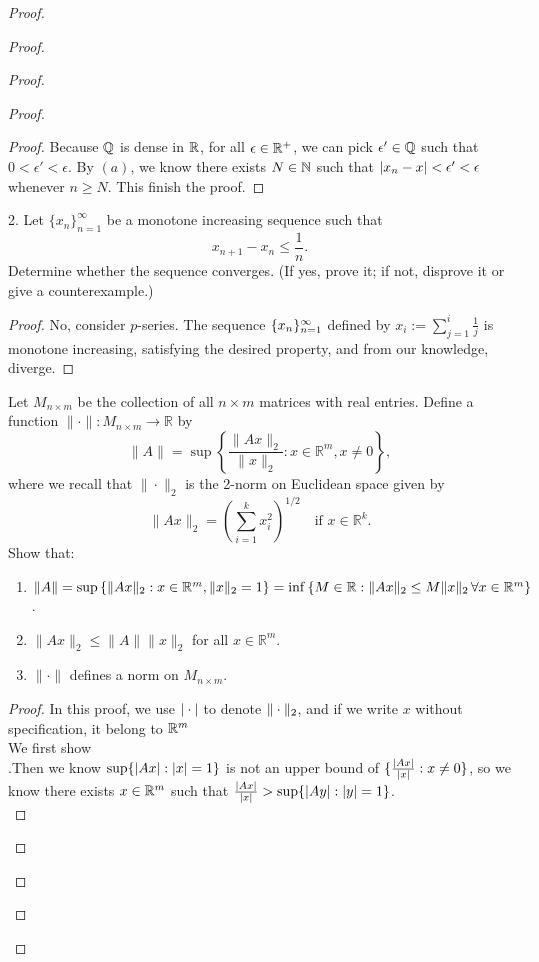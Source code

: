 \documentclass{report}
\begin{document}
\begin{proof}
\begin{proof}
\begin{proof}
\begin{proof}
\begin{proof}
Because $\mathbb{Q}$ is dense in  $\mathbb{R}$,  for all $\epsilon \in \mathbb{R}^+$, we can pick $\epsilon' \in \mathbb{Q}$ such that $0<\epsilon '< \epsilon $. By $(a)$,  we know there exists $N\in \mathbb{N}$ such that $|x_n-x|<\epsilon ' <\epsilon $ whenever $n\geq N$. This finish the proof.
\end{proof}
\begin{question}{}{}
2. Let $\{x_n\}_{n=1}^{\infty}$ be a monotone increasing sequence such that 
\[x_{n+1} - x_n \leq \frac{1}{n}.\]
Determine whether the sequence converges. (If yes, prove it; if not, disprove it or give a counterexample.)
\end{question}
\begin{proof}
No, consider $p$-series. The sequence $\{ x_n \}_{n=1}^{\infty}$ defined by $x_i:=\sum_{j=1}^i \frac{1}{j}$ is monotone increasing, satisfying the desired property, and from our knowledge, diverge. 
\end{proof}
\begin{question}{}{}
Let $M_{n \times m}$ be the collection of all $n \times m$ matrices with real entries. Define a function $\| \cdot \|: M_{n \times m} \to \mathbb{R}$ by
\[
\| A \| = \sup \left\{ \frac{\|Ax\|_2}{\|x\|_2} : x \in \mathbb{R}^m, x \neq 0 \right\},
\]
where we recall that $\| \cdot \|_2$ is the 2-norm on Euclidean space given by
\[
\| Ax \|_2 = \left( \sum_{i=1}^{k} x_i^2 \right)^{1/2} \quad \text{if } x \in \mathbb{R}^k.
\]
Show that:
\begin{enumerate}
    \item $\| A \| = \sup \left\{ \|Ax\|_2 : x \in \mathbb{R}^m, \| x \|_2 =1 \right\} = \inf \left\{ M \in \mathbb{R} : \|Ax\|_2 \leq M \|x\|_2 \, \forall x \in \mathbb{R}^m \right\}$.
    \item $\| Ax \|_2 \leq \| A \| \| x \|_2$ for all $x \in \mathbb{R}^m$.
    \item $\| \cdot \|$ defines a norm on $M_{n \times m}$.
\end{enumerate}
\end{question}
\begin{proof}
In this proof, we use $|\cdot|$ to denote $\| \cdot \|_2$, and if we write $x$ without specification, it belong to  $\mathbb{R}^m$\\

We first show \\

.Then we know $ \sup \{ |Ax|:|x|=1 \} $ is not an upper bound of $ \{ \frac{|Ax|}{|x|}:x\neq 0 \} $, so we know there exists $x\in \mathbb{R}^m$ such that $\frac{|Ax|}{|x|}>\sup \{ |Ay|:|y|=1 \}$.\\


\end{proof}
\end{proof}
\end{proof}
\end{proof}
\end{proof}
\end{document}
